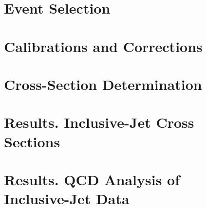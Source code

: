\documentclass[12pt,a4paper,reqno,twoside,final]{scrbook}%
\numberwithin{equation}{subsection}
\begin{document}
 \chapter{Event Selection}
 \label{ch:selection}
 

 \chapter{Calibrations and Corrections}
 \label{ch:calibcorr}
 

 \chapter{Cross-Section Determination}
 \label{ch:unfolding}
 

\chapter{Results. Inclusive-Jet Cross Sections}
\label{ch:resultscs}
 

\chapter{Results. QCD Analysis of Inclusive-Jet Data}
\label{ch:resultsqcdfit}

\end{document}

